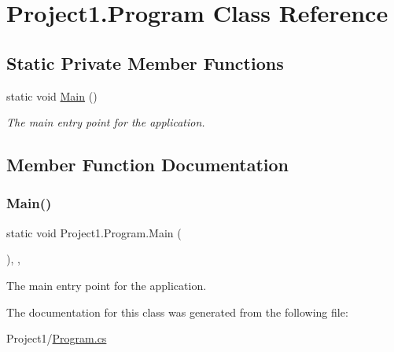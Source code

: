 \hypertarget{classProject1_1_1Program}{}\section{Project1.\+Program Class Reference}
\label{classProject1_1_1Program}
\subsection*{Static Private Member Functions}
\begin{DoxyCompactItemize}
\item 
static void \hyperlink{classProject1_1_1Program_a41c8e8ccb50be0b9beb690ea31883d3a}{Main} ()
\begin{DoxyCompactList}\small\item\em The main entry point for the application. \end{DoxyCompactList}\end{DoxyCompactItemize}


\subsection{Member Function Documentation}
\mbox{\label{classProject1_1_1Program_a41c8e8ccb50be0b9beb690ea31883d3a}} 
\subsubsection{\texorpdfstring{Main()}{Main()}}
{\footnotesize\ttfamily static void Project1.\+Program.\+Main (\begin{DoxyParamCaption}{ }\end{DoxyParamCaption})\hspace{0.3cm}{\ttfamily [inline]}, {\ttfamily [static]}, {\ttfamily [private]}}



The main entry point for the application. 



The documentation for this class was generated from the following file\+:\begin{DoxyCompactItemize}
\item 
Project1/\hyperlink{Program_8cs}{Program.\+cs}\end{DoxyCompactItemize}
